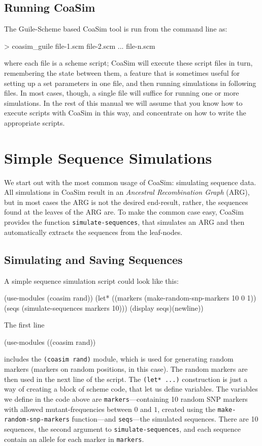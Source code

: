 \documentclass{manual}
\begin{document}
\subsection{Running CoaSim}
\label{sec:running-coasim}

The Guile-Scheme based CoaSim tool is run from the command line as:
\begin{code}
> coasim_guile file-1.scm file-2.scm ... file-n.scm
\end{code}
where each file is a scheme script; CoaSim will execute these script
files in turn, remembering the state between them, a feature that is
sometimes useful for setting up a set parameters in one file, and then
running simulations in following files.  In most cases, though, a
single file will suffice for running one or more simulations.  In the
rest of this manual we will assume that you know how to execute
scripts with CoaSim in this way, and concentrate on how to write the
appropriate scripts.

\section{Simple Sequence Simulations}
\label{sec:simple-sequ-simul}

We start out with the most common usage of CoaSim: simulating sequence
data.  All simulations in CoaSim result in an \emph{Ancestral
  Recombination Graph} (ARG), but in most cases the ARG is not the
desired end-result, rather, the sequences found at the leaves of the
ARG are.  To make the common case easy, CoaSim provides the function
\texttt{simulate-sequences}, that simulates an ARG and then
automatically extracts the sequences from the leaf-nodes.


\subsection{Simulating and Saving Sequences}
\label{sec:simul-saving-sequ}

A simple sequence simulation script could look like this:
\begin{code}
(use-modules (coasim rand))
(let* ((markers (make-random-snp-markers 10 0 1))
       (seqs (simulate-sequences markers 10)))
  (display seqs)(newline))
\end{code}

The first line
\begin{code}
(use-modules ((coasim rand))
\end{code}
includes the \texttt{(coasim rand)} module, which is used for
generating random markers (markers on random positions, in this case).
The random markers are then used in the next line of the script.  The
\verb?(let* ...)? construction is just a way of creating a block of
scheme code, that let us define variables.  The variables we define in
the code above are \texttt{markers}---containing 10 random SNP markers
with allowed mutant-frequencies between $0$ and $1$, created using the
\texttt{make-random-snp-markers} function---and \texttt{seqs}---the
simulated sequences.  There are 10 sequences, the second argument to
\texttt{simulate-sequences}, and each sequence contain an allele for
each marker in \texttt{markers}.
\end{document}
